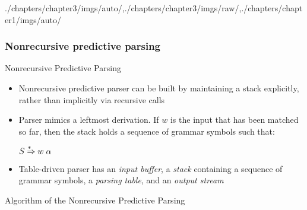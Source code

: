 \begin{graphicspathcontext}{{./chapters/chapter3/imgs/auto/},{./chapters/chapter3/imgs/raw/},{./chapters/chapter1/imgs/auto/}}
\begin{bibunit}[apalike]
\subsubsection{Nonrecursive predictive parsing}
\subsubsectiontableofcontentslide

\begin{frame}{Nonrecursive Predictive Parsing}
	\begin{itemize}
	\item Nonrecursive predictive parser can be built by maintaining a stack explicitly, rather than implicitly via recursive calls
	\item Parser mimics a leftmost derivation. If $w$ is the input that has been matched so far, then the stack holds a sequence of grammar symbols such that:
		\begin{center}
			$S \overset{*\hspace{.4em}}{\Rightarrow} w\;\alpha$
		\end{center}
	\item Table-driven parser has an \emph{input buffer}, a \emph{stack} containing a sequence of grammar symbols, a \emph{parsing table}, and an \emph{output stream}
	\end{itemize}
	\begin{center}
	\end{center}
\end{frame}

\begin{frame}[t]{Algorithm of the Nonrecursive Predictive Parsing}
	\begin{scriptsize}
	\begin{myalgorithm}
	\BlankLine
	\end{myalgorithm}
	\end{scriptsize}
\end{frame}


\end{bibunit}
\end{graphicspathcontext}
